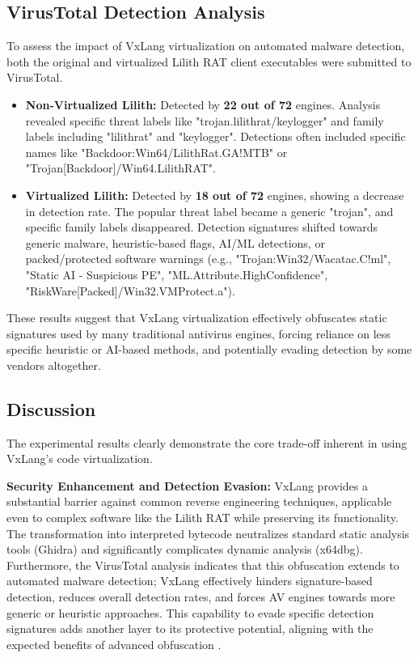 \subsection{VirusTotal Detection Analysis}
To assess the impact of VxLang virtualization on automated malware detection, both the original and virtualized Lilith RAT client executables  were submitted to VirusTotal.

\begin{itemize}
	\item \textbf{Non-Virtualized Lilith:} Detected by \textbf{22 out of 72} engines. Analysis revealed specific threat labels like "trojan.lilithrat/keylogger" and family labels including "lilithrat" and "keylogger". Detections often included specific names like "Backdoor:Win64/LilithRat.GA!MTB" or "Trojan[Backdoor]/Win64.LilithRAT".
	\item \textbf{Virtualized Lilith:} Detected by \textbf{18 out of 72} engines, showing a decrease in detection rate. The popular threat label became a generic "trojan", and specific family labels disappeared. Detection signatures shifted towards generic malware, heuristic-based flags, AI/ML detections, or packed/protected software warnings (e.g., "Trojan:Win32/Wacatac.C!ml", "Static AI - Suspicious PE", "ML.Attribute.HighConfidence", "RiskWare[Packed]/Win32.VMProtect.a").
\end{itemize}
These results suggest that VxLang virtualization effectively obfuscates static signatures used by many traditional antivirus engines, forcing reliance on less specific heuristic or AI-based methods, and potentially evading detection by some vendors altogether.

\subsection{Discussion}
The experimental results clearly demonstrate the core trade-off inherent in using VxLang's code virtualization.

\textbf{Security Enhancement and Detection Evasion:} VxLang provides a substantial barrier against common reverse engineering techniques, applicable even to complex software like the Lilith RAT while preserving its functionality. The transformation into interpreted bytecode neutralizes standard static analysis tools (Ghidra) and significantly complicates dynamic analysis (x64dbg). Furthermore, the VirusTotal analysis indicates that this obfuscation extends to automated malware detection; VxLang effectively hinders signature-based detection, reduces overall detection rates, and forces AV engines towards more generic or heuristic approaches. This capability to evade specific detection signatures adds another layer to its protective potential, aligning with the expected benefits of advanced obfuscation \cite{Ore06, Sal18, Rou13}.

